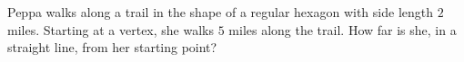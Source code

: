 Peppa walks along a trail in the shape of a regular hexagon with side length $2$ miles. Starting at a vertex, she walks $5$ miles along the trail. How far is she, in a straight line, from her starting point?
